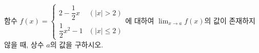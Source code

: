 함수 $f(x)=\begin{cases} 2-\dfrac{1}{2}x & (|x|>2) \\[1ex] \dfrac{1}{2}x^2-1 & (|x|\le 2) \end{cases}$에 대하여 $\displaystyle\lim_{x\to a} f(x)$의 값이 존재하지 않을 때, 상수 $a$의 값을 구하시오.
